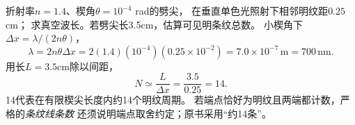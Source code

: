 \problemtext 折射率$n=1.4$、楔角$\theta=10^{-4}$ rad的劈尖，
在垂直单色光照射下相邻明纹距$0.25$cm；
求真空波长。若劈尖长3.5cm，估算可见明条纹总数。
\workings
小楔角下$\Delta x=\lambda/(2n\theta)$，
\[
\boxed{\lambda=2n\theta\Delta x
=2(1.4)(10^{-4})(0.25\times10^{-2})
=7.0\times10^{-7}\,\mathrm m=700\,\mathrm{nm}}.
\]
用长$L=3.5$cm除以间距，
\[
\boxed{N\simeq\frac{L}{\Delta x}
=\frac{3.5}{0.25}=14}.
\]
\crosscheck 14代表在有限楔尖长度内约14个明纹周期。
若端点恰好为明纹且两端都计数，严格的\emph{条纹线条数}
还须说明端点取舍约定；原书采用“约14条”。

